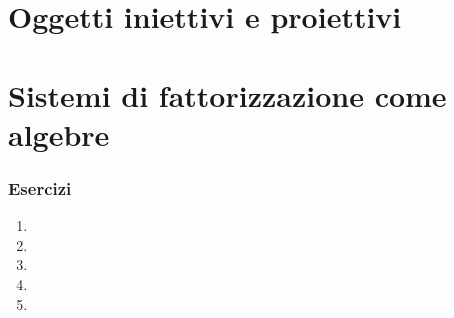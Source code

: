 \section[Iniettivi e proiettivi]{Oggetti iniettivi e proiettivi}
\section[Fattorizzazione e algebre]{Sistemi di fattorizzazione come algebre}
\subsubsection*{Esercizi}
\begin{enumerate}
    \item 
    \item 
    \item 
    \item 
    \item 
\end{enumerate}
